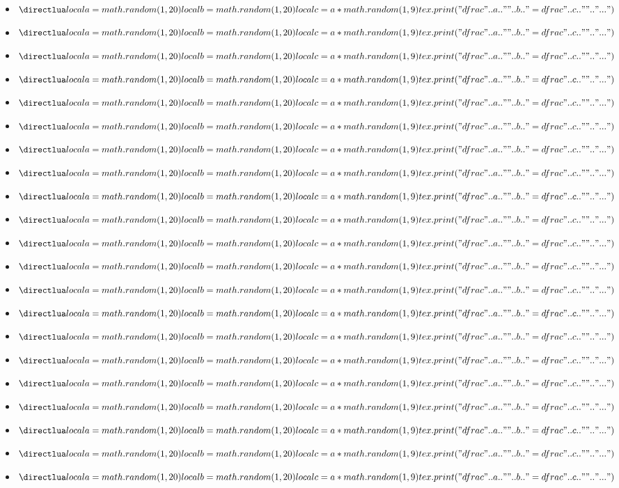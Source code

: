 \documentclass["../Cours.tex"]{subfiles}
\begin{document}
\begin{multicols}{3}
\begin{itemize}
    \item $\trandom$
    \item $\trandom$
    \item $\trandom$
    \item $\trandom$
    \item $\trandom$
    \item $\trandom$
    \item $\trandom$
    \item $\trandom$
    \item $\trandom$
    \item $\trandom$
    \item $\trandom$
    \item $\trandom$
    \item $\trandom$
    \item $\trandom$
    \item $\trandom$
    \item $\trandom$
    \item $\trandom$
    \item $\trandom$
    \item $\trandom$
    \item $\trandom$
    \item $\trandom$
\end{itemize}
\end{multicols}
\end{document}
